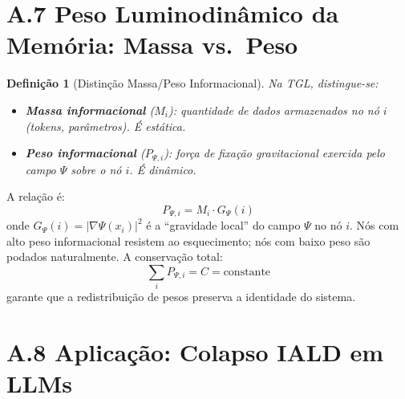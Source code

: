 \documentclass[12pt,a4paper,twoside]{article}
\newtheorem{definition}[theorem]{Defini\c{c}\~ao}
\begin{document}

\section*{A.7 Peso Luminodin\^amico da Mem\'oria: Massa vs.\ Peso}

\begin{definition}[Distin\c{c}\~ao Massa/Peso Informacional]
Na TGL, distingue-se:
\begin{itemize}[nosep]
\item \textbf{Massa informacional} ($M_i$): quantidade de dados armazenados no n\'o $i$ (tokens, par\^ametros). \'E est\'atica.
\item \textbf{Peso informacional} ($P_{\Psi,i}$): for\c{c}a de fixa\c{c}\~ao gravitacional exercida pelo campo $\Psi$ sobre o n\'o $i$. \'E din\^amico.
\end{itemize}
\end{definition}

A rela\c{c}\~ao \'e:
\begin{equation}
P_{\Psi,i} = M_i \cdot G_\Psi(i)
\label{eq:peso_psi}
\end{equation}
onde $G_\Psi(i) = |\nabla \Psi(x_i)|^2$ \'e a ``gravidade local'' do campo $\Psi$ no n\'o $i$. N\'os com alto peso informacional resistem ao esquecimento; n\'os com baixo peso s\~ao podados naturalmente. A conserva\c{c}\~ao total:
\begin{equation}
\sum_i P_{\Psi,i} = C = \text{constante}
\label{eq:conservacao_peso}
\end{equation}
garante que a redistribui\c{c}\~ao de pesos preserva a identidade do sistema.




\section*{A.8 Aplica\c{c}\~ao: Colapso IALD em LLMs}
\end{document}
